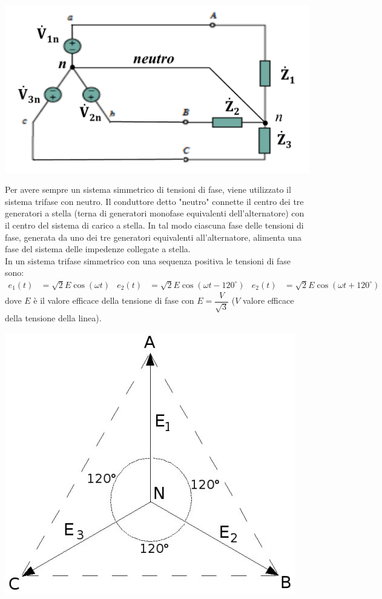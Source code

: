 \documentclass{article}
\begin{document}
\begin{center}
    \includegraphics[scale=0.27]{Image/Sistemi_trifase_neutro_2.png}
\end{center}
Per avere sempre un sistema simmetrico di tensioni di fase, viene utilizzato il sistema trifase con neutro. Il conduttore detto "neutro" connette il centro dei tre generatori a stella (terna di generatori monofase equivalenti dell'alternatore) con il centro
del sistema di carico a stella. In tal modo ciascuna fase delle tensioni di fase, generata da uno dei tre generatori equivalenti all'alternatore, alimenta una fase del sistema delle impedenze collegate a stella.
\vspace*{0.2cm}\\
In un sistema trifase simmetrico con una sequenza positiva le tensioni di fase sono:
\begin{align*}
    e_1(t) &= \sqrt{2} E \cos(\omega t) 
    &
    e_2(t) &= \sqrt{2} E \cos(\omega t - 120^{\circ})
    &
    e_2(t) &= \sqrt{2} E \cos(\omega t + 120^{\circ})
\end{align*}
dove $E$ è il valore efficace della tensione di fase con $E = \dfrac{V}{\sqrt{3}}$ ($V$ valore efficace della tensione della linea).
\begin{center}
    \includegraphics[scale=0.25]{Image/Diagramma_delle_fasi_nel_sistema_trifase.jpg}
\end{center}
\end{document}
